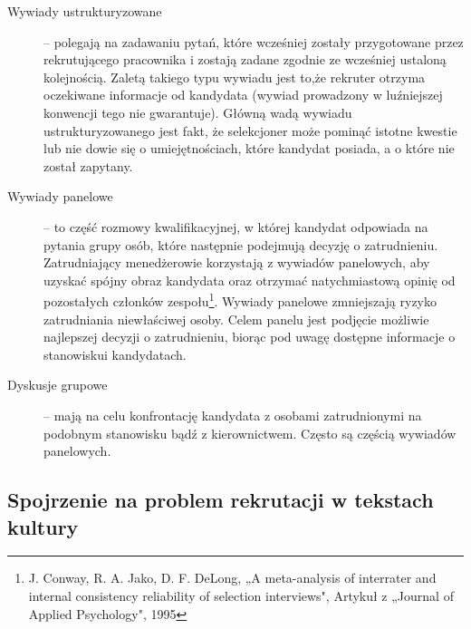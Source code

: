 \documentclass[twoside]{projektInzynierskiMS}
\numberwithin{figure}{section}
\begin{document}
\begin{description}
\item[Wywiady ustrukturyzowane] – polegają na zadawaniu pytań, które wcześniej zostały przygotowane przez rekrutującego pracownika i zostają zadane zgodnie ze wcześniej ustaloną kolejnością. Zaletą takiego typu wywiadu jest to,\linebreak że rekruter otrzyma oczekiwane informacje od kandydata (wywiad prowadzony w luźniejszej konwencji tego nie gwarantuje). Główną wadą wywiadu ustrukturyzowanego jest fakt, że selekcjoner może pominąć istotne kwestie lub nie dowie się o umiejętnościach, które kandydat posiada, a o które nie został zapytany.
\item[Wywiady panelowe]  –  to część rozmowy kwalifikacyjnej, w której kandydat odpowiada na pytania grupy osób, które następnie podejmują decyzję o zatrudnieniu. Zatrudniający menedżerowie korzystają z wywiadów panelowych, aby uzyskać spójny obraz kandydata oraz otrzymać natychmiastową opinię od pozostałych członków zespołu\footnote{J. Conway, R. A. Jako, D. F. DeLong, „A meta-analysis of interrater and internal consistency reliability of selection interviews", Artykuł z „Journal of Applied Psychology", 1995}. Wywiady panelowe zmniejszają ryzyko zatrudniania niewłaściwej osoby. Celem panelu jest podjęcie możliwie najlepszej decyzji o zatrudnieniu, biorąc pod uwagę dostępne informacje o stanowisku\linebreak i kandydatach.
\item[Dyskusje grupowe] – mają na celu konfrontację kandydata z osobami zatrudnionymi na podobnym stanowisku bądź z kierownictwem. Często są częścią wywiadów panelowych.
\end{description}


\subsection{Spojrzenie na problem rekrutacji w tekstach kultury}
\end{document}
